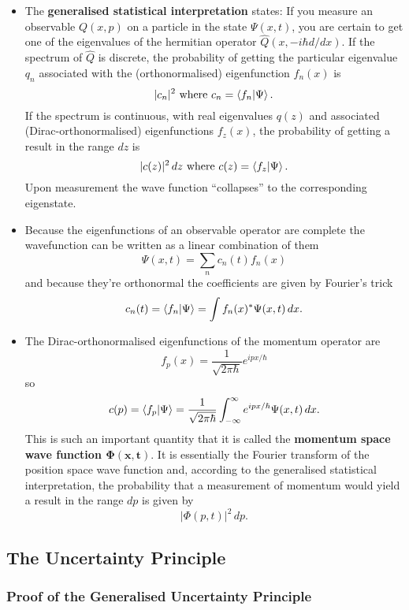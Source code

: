 \documentclass{article}
\begin{document}
\begin{itemize}
  \item The \textbf{generalised statistical interpretation} states: If you measure an observable $Q(x, p)$ on a particle in the state $\Psi(x, t)$, you are certain to get one of the eigenvalues of the hermitian operator $\hat{Q}(x, -i \hbar d / d x)$. If the spectrum of $\hat{Q}$ is discrete, the probability of getting the particular eigenvalue $q_n$ associated with the (orthonormalised) eigenfunction $f_n(x)$ is \[|c_n|^2 \text{ where } c_n = \braket{f_n | \Psi}.\] If the spectrum is continuous, with real eigenvalues $q(z)$ and associated (Dirac-orthonormalised) eigenfunctions $f_z(x)$, the probability of getting a result in the range $d z$ is \[|c(z)|^2 \,d z \text{ where } c(z) = \braket{f_z | \Psi}.\] Upon measurement the wave function ``collapses'' to the corresponding eigenstate.

  \item Because the eigenfunctions of an observable operator are complete the wavefunction can be written as a linear combination of them \[\Psi(x, t) = \sum_n c_n(t) f_n(x)\] and because they're orthonormal the coefficients are given by Fourier's trick \[c_n(t) = \braket{f_n | \Psi} = \int f_n(x)^* \Psi(x, t) \,d x.\]

  \item The Dirac-orthonormalised eigenfunctions of the momentum operator are \[f_p(x) = \frac{1}{\sqrt{2 \pi \hbar}} e^{i p x / \hbar}\] so \[c(p) = \braket{f_p | \Psi} = \frac{1}{\sqrt{2 \pi \hbar}} \int_{-\infty}^\infty e^{i p x / \hbar} \Psi(x, t) \,d x.\] This is such an important quantity that it is called the \textbf{momentum space wave function $\boldsymbol{\Phi(x, t)}$}. It is essentially the Fourier transform of the position space wave function and, according to the generalised statistical interpretation, the probability that a measurement of momentum would yield a result in the range $d p$ is given by \[|\Phi(p, t)|^2 \,d p.\]
\end{itemize}

\subsection{The Uncertainty Principle}

\subsubsection{Proof of the Generalised Uncertainty Principle}
\end{document}
